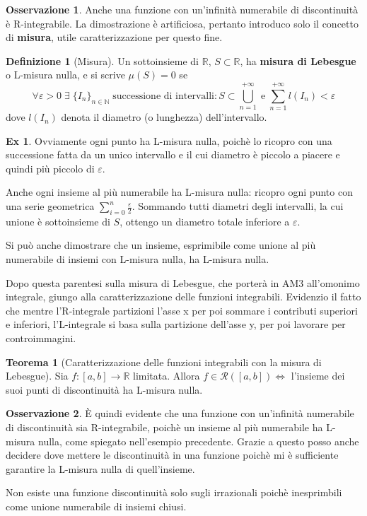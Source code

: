 \documentclass{article}
\theoremstyle{definition}
\newtheorem{theorem}{Teorema}[section]
\theoremstyle{definition}
\theoremstyle{definition}
\newtheorem{definition}{Definizione}[section]
\theoremstyle{definition}
\newtheorem{remark}{Osservazione}[section]
\theoremstyle{definition}
\newtheorem{example}{Ex}[section]
\theoremstyle{definition}
\begin{document}
\begin{remark}
    Anche una funzione con un'infinità numerabile di discontinuità è R-integrabile. La dimostrazione è artificiosa, pertanto introduco solo il concetto di \textbf{misura}, utile caratterizzazione per questo fine.
\end{remark}

\begin{definition}[Misura]
    Un sottoinsieme di $\mathbb{R}$, $S\subset \mathbb{R}$, ha \textbf{misura di Lebesgue} o L-misura nulla, e si scrive $\mu(S)=0$ se 
    \[
        \forall \varepsilon > 0 \; \exists \; \lbrace I_n \rbrace_{n\in \mathbb{N}} \; \text{successione di intervalli} : S \subset \bigcup_{n=1}^{+\infty} \; \text{e} \; \sum_{n=1}^{+\infty} l(I_n)<\varepsilon
    \]
    dove $l(I_n)$ denota il diametro (o lunghezza) dell'intervallo.
\end{definition}

\begin{example}
    Ovviamente ogni punto ha L-misura nulla, poichè lo ricopro con una successione fatta da un unico intervallo e il cui diametro è piccolo a piacere e quindi più piccolo di $\varepsilon$.

    Anche ogni insieme al più numerabile ha L-misura nulla: ricopro ogni punto con una serie geometrica $\displaystyle\sum_{i=0}^{n}\frac{\varepsilon}{2}$. Sommando tutti diametri degli intervalli, la cui unione è sottoinsieme di $S$, ottengo un diametro totale inferiore a $\varepsilon$.

    Si può anche dimostrare che un insieme, esprimibile come unione al più numerabile di insiemi con L-misura nulla, ha L-misura nulla.
\end{example}

Dopo questa parentesi sulla misura di Lebesgue, che porterà in AM3 all'omonimo integrale, giungo alla caratterizzazione delle funzioni integrabili. Evidenzio il fatto che mentre l'R-integrale partizioni l'asse x per poi sommare i contributi superiori e inferiori, l'L-integrale si basa sulla partizione dell'asse y, per poi lavorare per controimmagini.

\begin{theorem}[Caratterizzazione delle funzioni integrabili con la misura di Lebesgue]
    Sia $f:[a,b] \rightarrow \mathbb{R}$ limitata. Allora $f\in \mathcal{R}([a,b]) \Leftrightarrow$ l'insieme dei suoi punti di discontinuità ha L-misura nulla. 
\end{theorem}

\begin{remark}
    È quindi evidente che una funzione con un'infinità numerabile di discontinuità sia R-integrabile, poichè un insieme al più numerabile ha L-misura nulla, come spiegato nell'esempio precedente. Grazie a questo posso anche decidere dove mettere le discontinuità in una funzione poichè mi è sufficiente garantire la L-misura nulla di quell'insieme.

    Non esiste una funzione discontinuità solo sugli irrazionali poichè inesprimbili come unione numerabile di insiemi chiusi.
\end{remark}
\end{document}
